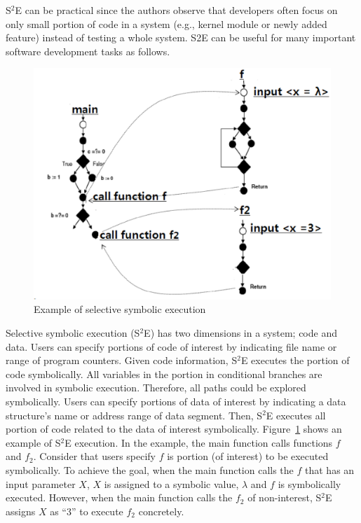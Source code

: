 S$^2$E can be practical since the authors observe that developers often focus on only small portion of code in a system (e.g., kernel module or newly added feature) instead of testing a whole system. S2E can be useful for many important software development tasks as follows.

\begin{figure}
\centering
\includegraphics[scale=0.6,clip]{fig/selective.eps} 
\caption{\label{fig:s2e}Example of selective symbolic execution} 
\end{figure}


Selective symbolic execution (S$^2$E) has two dimensions in a system; code and data. Users can specify portions of code of interest by indicating file name or range of program counters. Given code information, S$^2$E executes the portion of code symbolically. All variables in the portion in conditional branches are involved in symbolic execution. Therefore, all paths could be explored symbolically. Users can specify portions of data of interest by indicating a data structure's name or address range of data segment. Then, S$^2$E executes all portion of code related to the data of interest symbolically.
Figure~\ref{fig:s2e} shows an example of S$^2$E execution. In the example, the main function calls functions $f$ and $f_2$. Consider that users specify $f$ is portion (of interest) to be executed symbolically. To achieve the goal, when the main function calls the $f$ that has an input parameter $X$, $X$ is assigned to a symbolic value, $\lambda$ and $f$ is symbolically executed. However, when the main function calls the $f_2$ of non-interest, S$^2$E assigns $X$ as ``3'' to execute $f_2$ concretely.


